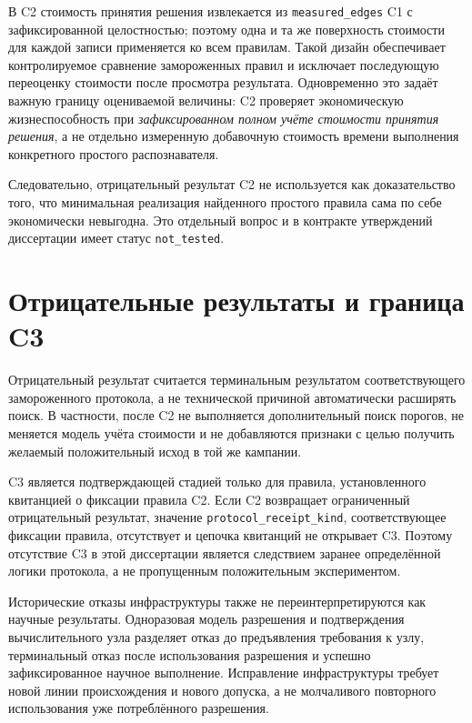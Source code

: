 В C2 стоимость принятия решения извлекается из
\texttt{measured\_edges} C1 с зафиксированной целостностью; поэтому одна и та
же поверхность стоимости для каждой записи применяется ко всем правилам.
Такой дизайн обеспечивает контролируемое сравнение замороженных правил и
исключает последующую переоценку стоимости после просмотра результата.
Одновременно это задаёт важную границу оцениваемой величины: C2 проверяет
экономическую жизнеспособность при \emph{зафиксированном полном учёте стоимости
принятия решения}, а не отдельно измеренную добавочную стоимость времени
выполнения конкретного простого распознавателя.

Следовательно, отрицательный результат C2 не используется как доказательство
того, что минимальная реализация найденного простого правила сама по себе
экономически невыгодна. Это отдельный вопрос и в контракте утверждений
диссертации имеет статус \texttt{not\_tested}.

\section{Отрицательные результаты и граница C3}
\label{sec:method-negative}

Отрицательный результат считается терминальным результатом соответствующего
замороженного протокола, а не технической причиной автоматически расширять
поиск. В частности, после C2 не выполняется дополнительный поиск порогов, не
меняется модель учёта стоимости и не добавляются признаки с целью получить
желаемый положительный исход в той же кампании.

C3 является подтверждающей стадией только для правила, установленного квитанцией
о фиксации правила C2. Если C2 возвращает ограниченный отрицательный результат,
значение \texttt{protocol\_receipt\_kind}, соответствующее фиксации правила,
отсутствует и цепочка квитанций не открывает C3. Поэтому отсутствие C3 в этой
диссертации является следствием заранее определённой логики протокола, а не
пропущенным положительным экспериментом.

Исторические отказы инфраструктуры также не переинтерпретируются как научные
результаты. Одноразовая модель разрешения и подтверждения вычислительного узла
разделяет отказ до предъявления требования к узлу, терминальный отказ после
использования разрешения и успешно зафиксированное научное выполнение.
Исправление инфраструктуры требует новой линии происхождения и нового допуска,
а не молчаливого повторного использования уже потреблённого разрешения.

